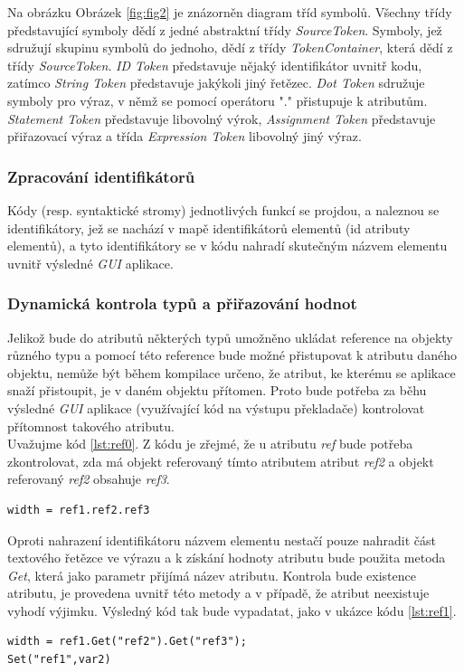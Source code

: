 \documentclass[11pt,twoside,a4paper]{book}
\begin{document}
Na obrázku Obrázek \ref{fig:fig2} je znázorněn diagram tříd symbolů. Všechny třídy představující symboly dědí z jedné abstraktní třídy \textit{SourceToken}. Symboly, jež sdružují skupinu symbolů do jednoho, dědí z třídy \textit{TokenContainer}, která dědí z třídy \textit{SourceToken}. \textit{ID Token} představuje nějaký identifikátor uvnitř kodu, zatímco \textit{String Token} představuje jakýkoli jiný řetězec. \textit{Dot Token} sdružuje symboly pro výraz, v němž se pomocí operátoru "." přistupuje k atributům. \textit{Statement Token} představuje libovolný výrok, \textit{Assignment Token} představuje přiřazovací výraz a třída \textit{Expression Token} libovolný jiný výraz.

\subsubsection{Zpracování identifikátorů}
Kódy (resp. syntaktické stromy) jednotlivých funkcí se projdou, a naleznou se identifikátory, jež se nachází v mapě identifikátorů elementů (id atributy elementů), a tyto identifikátory se v kódu nahradí skutečným názvem elementu uvnitř výsledné \textit{GUI} aplikace.
\subsubsection{Dynamická kontrola typů a přiřazování hodnot}
Jelikož bude do atributů některých typů umožněno ukládat reference na objekty různého typu a pomocí této reference bude možné přistupovat k atributu daného objektu, nemůže být během kompilace určeno, že atribut, ke kterému se aplikace snaží přistoupit, je v daném objektu přítomen. Proto bude potřeba za běhu výsledné \textit{GUI} aplikace (využívající kód na výstupu překladače) kontrolovat přítomnost takového atributu.\\
Uvažujme kód \ref{lst:ref0}. Z kódu je zřejmé, že u atributu \textit{ref} bude potřeba zkontrolovat, zda má objekt referovaný tímto atributem atribut \textit{ref2} a objekt referovaný \textit{ref2} obsahuje \textit{ref3}.

\begin{lstlisting}[frame=single,caption=Pseudokód problematického použití operátoru "." v přiřazovacím výroku. \label{lst:ref0}]
width = ref1.ref2.ref3
\end{lstlisting}
Oproti nahrazení identifikátoru názvem elementu nestačí pouze nahradit část textového řetězce ve výrazu a k získání hodnoty atributu bude použita metoda \textit{Get}, která jako parametr přijímá název atributu. Kontrola bude existence atributu, je provedena uvnitř této metody a v případě, že atribut neexistuje vyhodí výjimku. Výsledný kód tak bude vypadatat, jako v ukázce kódu \ref{lst:ref1}.
\begin{lstlisting}[frame=single,caption=Řešení v pseudokódu problematického použití operátoru "." v přiřazovacím výroku. \label{lst:ref1}]
width = ref1.Get("ref2").Get("ref3");
Set("ref1",var2)
\end{lstlisting}
\end{document}
